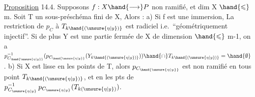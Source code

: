 \uline{Proposition} 14.4. Supposons $f:X\hand{\longrightarrow} P$ non ramifié, et dim X $\hand{\leqslant}$ m.
Soit T un sous-préschéma fini de X, Alors :
 a) Si f est une immersion, La restriction de $p_C$ à $T_{k\hand{(\unsure{\eta|y})}}$ est  radiciel i.e.\ ``géométriquement injectif''. Si de
plus Y est une partie fermée de X de dimension $\hand{\leqslant}$ m-1, on a
$p_{C_{\hand{\unsure{\eta|y}}}}^{-1}(p_{C_{\hand{\unsure{\eta|y}}}}(Y_{k\hand{(\unsure{\eta|y})}})) \hand{\cap} T_{k\hand{(\unsure{\eta|y})}} = \hand{\emptyset}$ .
b) Si X est lisse en les points de T, alors $p_{C_{\hand{\unsure{\eta|y}}}}$ est non ramifié
en tous point  $T_{k\hand{(\unsure{\eta|y})}}$,  et  en les pts de $p_{C_{\unsure{\eta|y}}}^{-1}\,p_{C_{\unsure{\eta|y}}}(T_{k(\unsure{\eta|y})})$.
